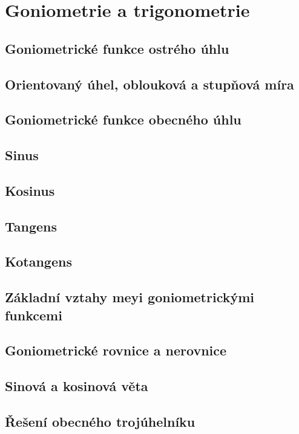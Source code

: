 
\newpage
    \section{Goniometrie a trigonometrie}

        \subsection{Goniometrické funkce ostrého úhlu}
        \subsection{Orientovaný úhel, oblouková a stupňová míra}
        \subsection{Goniometrické funkce obecného úhlu}
        \subsection{Sinus}
        \subsection{Kosinus}
        \subsection{Tangens}
        \subsection{Kotangens}
        \subsection{Základní vztahy meyi goniometrickými funkcemi}
        \subsection{Goniometrické rovnice a nerovnice}
        \subsection{Sinová a kosinová věta}
        \subsection{Řešení obecného trojúhelníku}
